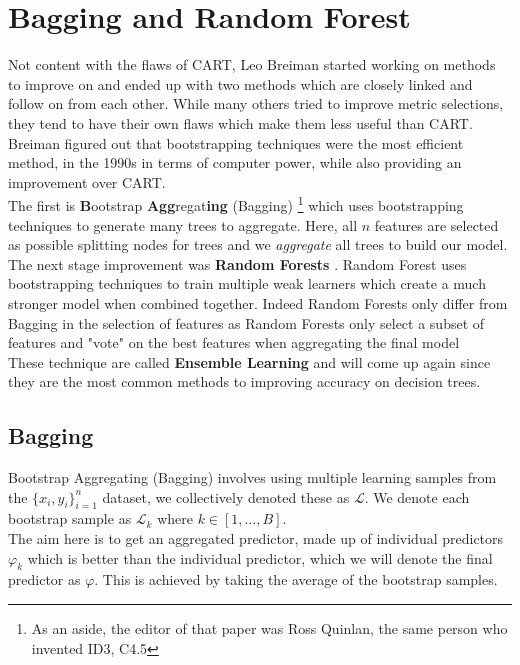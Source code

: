 \documentclass[11pt,a4paper]{report}
\begin{document}
\chapter{Bagging and Random Forest}
Not content with the flaws of CART, Leo Breiman started working on methods to improve on and ended up with two methods which are closely linked and follow on from each other. While many others tried to improve metric selections, they tend to have their own flaws which make them less useful than CART. Breiman figured out that bootstrapping techniques \cite{bootstrap} were the most efficient method, in the 1990s in terms of computer power, while also providing an improvement over CART.
\bigskip\\
The first is \textbf{B}ootstrap \textbf{Agg}regat\textbf{ing} (Bagging) \cite{bagging} \footnote{As an aside, the editor of that paper was Ross Quinlan, the same person who invented ID3, C4.5} which uses bootstrapping techniques to generate many trees to aggregate. Here, all $n$ features are selected as possible splitting nodes for trees and we \textit{aggregate} all trees to build our model.
\medskip\\
The next stage improvement was \textbf{Random Forests} \cite{randomforest}.
Random Forest uses bootstrapping techniques to train multiple weak learners which create a much stronger model when combined together.
Indeed Random Forests only differ from Bagging in the selection of features as Random Forests only select a subset of features and "vote" on the best features when aggregating the final model
\bigskip\\
These technique are called \textbf{Ensemble Learning} and will come up again since they are the most common methods to improving accuracy on decision trees.

\section{Bagging}
Bootstrap Aggregating (Bagging) involves using multiple learning samples from the $\{x_{i}, y_{i}\}_{i=1}^{n}$ dataset, we collectively denoted these as $\mathcal{L}$. 
We denote each bootstrap sample as $\mathcal{L}_k$ where $k \in [1, \dots, B]$.\\
The aim here is to get an aggregated predictor, made up of individual predictors $\varphi_k$ which is better than the individual predictor, which we will denote the final predictor as $\varphi$. 
This is achieved by taking the average of the bootstrap samples.
\end{document}
